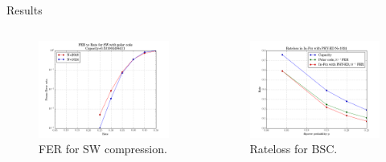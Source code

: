 \documentclass[final,hyperref={pdfpagelabels=false}]{beamer}
\begin{document}
\begin{frame}[t]
\begin{columns}[t]
\begin{column}{.465\textwidth}
\begin{block}{Results}
\begin{columns} %
\begin{column}{.5\textwidth}
\begin{figure}
\includegraphics[width=0.9\linewidth]{swfer.png}
\caption{FER for SW compression.}
\end{figure}
\end{column}
\begin{column}{.5\textwidth}
\begin{figure}
\includegraphics[width=0.9\linewidth]{rateloss.png}
\caption{Rateloss for BSC.}
\end{figure}
\end{column}
\end{columns}

\end{block}
\end{column}
\end{columns}
\end{frame}
\end{document}
